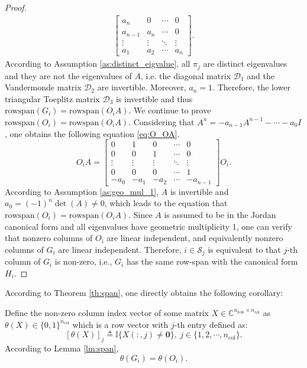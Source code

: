\documentclass[12pt]{article}
\newcommand{\Cb}{{\mathbb{C}}}
\newcommand{\Ib}{{\mathbb{I}}}
\newcommand{\Sc}{{\mathcal{S}}}
\newcommand{\rs}{\text{rowspan}}
\newtheorem*{proof}{\textbf{Proof}}
\begin{document}
\begin{proof}
\begin{align*}
\begin{bmatrix}
			a_n & 0 & \cdots &   0 \\
			a_{n-1} & a_n & \cdots &   0 \\
			\vdots & \vdots & \ddots  & \vdots \\
			a_1 & a_2 & \cdots  & a_n 
		\end{bmatrix}.
	\end{align*}
	According to Assumption \ref{as:distinct_eigvalue}, all $\pi_j$ are distinct eigenvalues and they are not the eigenvalues of $A$, i.e. the diagonal matrix $\mathcal{D}_1$ and the Vandermonde matrix $\mathcal{D}_2$ are invertible. Moreover, $a_n=1$. Therefore, the lower triangular Toeplitz matrix $\mathcal{D}_3$ is invertible and thus $\rs(G_i)=\rs(O_i A)$. 		
	We continue to prove $\rs(O_i)=\rs(O_i A)$. Considering that $A^n=-a_{n-1}A^{n-1}-\cdots-a_0 I$, one obtains the following equation \eqref{eq:O_OA}.
	\begin{equation}
		\label{eq:O_OA}
		O_i A=
		\begin{bmatrix}
			0 & 1 & 0 &  \cdots & 0 \\
			0 & 0 & 1 &  \cdots & 0 \\
			\vdots & \vdots & \vdots & \ddots & \vdots \\
			0 & 0 & 0 &  \cdots & 1 \\
			-a_0 & -a_1 & -a_2 & \cdots &  -a_{n-1}
		\end{bmatrix}
		O_i .
	\end{equation}	%
	According to Assumption \ref{as:geo_mul_1}, $A$ is invertible and $a_0=(-1)^n\det(A)\neq 0$, which leads to the equation that $\rs(O_i)=\rs(O_i A)$.
	Since $A$ is assumed to be in the Jordan canonical form and all eigenvalues have geometric multiplicity 1, one can verify that nonzero columns of $O_i$ are linear independent, and equivalently nonzero columns of $G_i$ are linear independent. Therefore, $i\in\Sc_j$ is equivalent to that $j$-th column of $G_i$ is non-zero, i.e., $G_i$ has the same row-span with the canonical form $H_i$.
\end{proof}
According to Theorem \ref{th:span}, one directly obtains the following corollary:


Define the non-zero column index vector of some matrix $X\in\Cb^{ n_{\text{row}}\times n_{\text{col}} }$ as $\theta(X)\in\{0,1\}^{n_{\text{col}}}$ which is a row vector with $j$-th entry defined as:
$$\left[\theta(X)\right]_j\triangleq \Ib\{X(:,j)\neq\mathbf{0} \},\ j\in\{1,2,\cdots,n_{\text{col}}\}. $$
According to Lemma \ref{lm:span}, 
\begin{equation}\label{eq:thetaGO}
	\theta(G_i)=\theta(O_i).
\end{equation}
\end{document}
